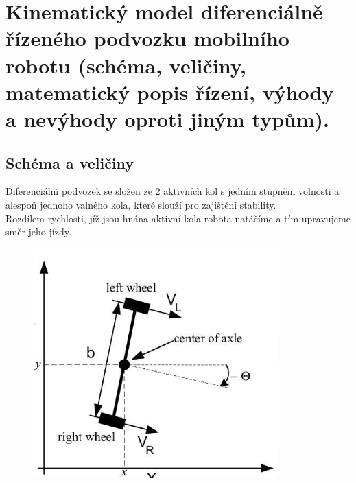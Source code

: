 \section{Kinematický model diferenciálně řízeného podvozku mobilního robotu (schéma, veličiny, matematický popis řízení, výhody a nevýhody oproti jiným typům).}
\subsection{Schéma a veličiny}
Diferenciální podvozek se složen ze 2 aktivních kol s jedním stupněm volnosti a alespoň jednoho valného kola, které slouží pro zajištění stability. \\
Rozdílem rychlosti, jíž jsou hnána aktivní kola robota natáčíme a tím upravujeme směr jeho jízdy.\\
\begin{figure}[h!]
    \centering
    \begin{minipage}[b]{0.4\textwidth}
        \includegraphics[width = \textwidth]{img/difPod.png}
    \end{minipage}
    \hfill
    \begin{minipage}[b]{0.4\textwidth}

\end{minipage}
\end{figure}
